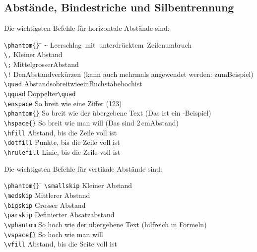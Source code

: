 \subsection{Abstände, Bindestriche und Silbentrennung}
Die wichtigsten Befehle für horizontale Abstände sind:
\begin{tabbing}
\quad \= \verb|\phantom{}| \qquad \= \kill
      \> \verb|~|          \> Leerschlag~mit~unterdrücktem~Zeilenumbruch \\
      \> \verb|\,|         \> Kleiner\,Abstand \\
      \> \verb|\;|         \> Mittelgrosser\;Abstand \\
      \> \verb|\!|         \> Den\!Abstand\!verkürzen (kann auch mehrmals angewendet werden: zum\!\!\!Beispiel) \\
      \> \verb|\quad|      \> Abstand\quad so\quad breit\quad wie\quad ein\quad Buchstabe\quad hoch\quad ist \\
      \> \verb|\qquad|     \> Doppelter\qquad \verb|\quad| \\
      \> \verb|\enspace|   \> So breit wie eine Ziffer (123) \\
      \> \verb|\phantom{}| \> So breit wie der übergebene Text (Das ist ein \phantom{Phantom}-Beispiel)\\
      \> \verb|\hspace{}|  \> So breit wie man will (Das sind 2\,cm\hspace{2cm}Abstand)\\
      \> \verb|\hfill|     \> Abstand, bis die Zeile voll ist \\
      \> \verb|\dotfill|   \> Punkte, bis die Zeile voll ist \\
      \> \verb|\hrulefill| \> Linie, bis die Zeile voll ist \\
\end{tabbing}

Die wichtigsten Befehle für vertikale Abstände sind:
\begin{tabbing}
\quad \= \verb|\phantom{}| \qquad \= \kill
      \> \verb|\smallskip| \> Kleiner Abstand\\
      \> \verb|\medskip|   \> Mittlerer Abstand\\
      \> \verb|\bigskip|   \> Grosser Abstand\\
      \> \verb|\parskip|   \> Definierter Absatzabstand\\
      \> \verb|\vphantom|  \> So hoch wie der übergebene Text (hilfreich in Formeln)\\
      \> \verb|\vspace{}|  \> So hoch wie man will\\
      \> \verb|\vfill|     \> Abstand, bis die Seite voll ist\\
\end{tabbing}

